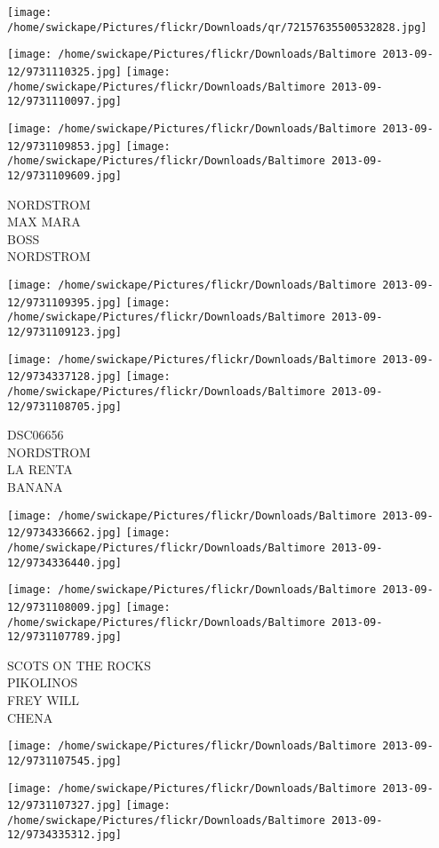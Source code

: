 \documentclass[10pt,letterpaper]{article}
\begin{document}
\texttt{[image: /home/swickape/Pictures/flickr/Downloads/qr/72157635500532828.jpg]}
\pagebreak

\texttt{[image: /home/swickape/Pictures/flickr/Downloads/Baltimore 2013-09-12/9731110325.jpg]}
\texttt{[image: /home/swickape/Pictures/flickr/Downloads/Baltimore 2013-09-12/9731110097.jpg]}

\texttt{[image: /home/swickape/Pictures/flickr/Downloads/Baltimore 2013-09-12/9731109853.jpg]}
\texttt{[image: /home/swickape/Pictures/flickr/Downloads/Baltimore 2013-09-12/9731109609.jpg]}

NORDSTROM\\
MAX MARA\\
BOSS\\
NORDSTROM
\pagebreak

\texttt{[image: /home/swickape/Pictures/flickr/Downloads/Baltimore 2013-09-12/9731109395.jpg]}
\texttt{[image: /home/swickape/Pictures/flickr/Downloads/Baltimore 2013-09-12/9731109123.jpg]}

\texttt{[image: /home/swickape/Pictures/flickr/Downloads/Baltimore 2013-09-12/9734337128.jpg]}
\texttt{[image: /home/swickape/Pictures/flickr/Downloads/Baltimore 2013-09-12/9731108705.jpg]}

DSC06656\\
NORDSTROM\\
LA RENTA\\
BANANA
\pagebreak

\texttt{[image: /home/swickape/Pictures/flickr/Downloads/Baltimore 2013-09-12/9734336662.jpg]}
\texttt{[image: /home/swickape/Pictures/flickr/Downloads/Baltimore 2013-09-12/9734336440.jpg]}

\texttt{[image: /home/swickape/Pictures/flickr/Downloads/Baltimore 2013-09-12/9731108009.jpg]}
\texttt{[image: /home/swickape/Pictures/flickr/Downloads/Baltimore 2013-09-12/9731107789.jpg]}

SCOTS ON THE ROCKS\\
PIKOLINOS\\
FREY WILL\\
CHENA
\pagebreak

\texttt{[image: /home/swickape/Pictures/flickr/Downloads/Baltimore 2013-09-12/9731107545.jpg]}

\vspace{0.25in}
\texttt{[image: /home/swickape/Pictures/flickr/Downloads/Baltimore 2013-09-12/9731107327.jpg]}
\texttt{[image: /home/swickape/Pictures/flickr/Downloads/Baltimore 2013-09-12/9734335312.jpg]}
\end{document}
